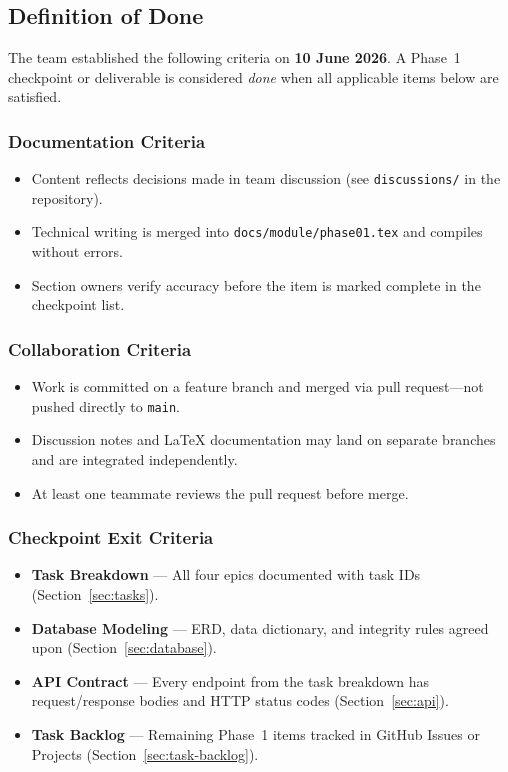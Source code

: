 \newpage
\subsection{Definition of Done}\label{sec:dod}
The team established the following criteria on \textbf{10 June 2026}. A Phase~1 checkpoint or
deliverable is considered \emph{done} when all applicable items below are satisfied.

\subsubsection{Documentation Criteria}
\begin{itemize}
  \item Content reflects decisions made in team discussion (see \texttt{discussions/} in the repository).
  \item Technical writing is merged into \texttt{docs/module/phase01.tex} and compiles without errors.
  \item Section owners verify accuracy before the item is marked complete in the checkpoint list.
\end{itemize}

\subsubsection{Collaboration Criteria}
\begin{itemize}
  \item Work is committed on a feature branch and merged via pull request---not pushed directly to \texttt{main}.
  \item Discussion notes and LaTeX documentation may land on separate branches and are integrated independently.
  \item At least one teammate reviews the pull request before merge.
\end{itemize}

\subsubsection{Checkpoint Exit Criteria}
\begin{itemize}
  \item \textbf{Task Breakdown} --- All four epics documented with task IDs (Section~\ref{sec:tasks}).
  \item \textbf{Database Modeling} --- ERD, data dictionary, and integrity rules agreed upon (Section~\ref{sec:database}).
  \item \textbf{API Contract} --- Every endpoint from the task breakdown has request/response bodies and HTTP status codes (Section~\ref{sec:api}).
  \item \textbf{Task Backlog} --- Remaining Phase~1 items tracked in GitHub Issues or Projects (Section~\ref{sec:task-backlog}).
\end{itemize}

